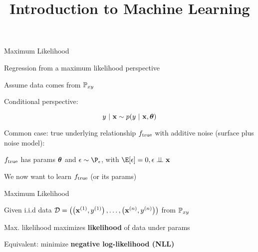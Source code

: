 \documentclass[11pt,compress,t,notes=noshow, xcolor=table]{beamer}
\title{Introduction to Machine Learning}
\begin{document}
    

\begin{framei}[sep=M]{Maximum Likelihood}

\item Regression from a maximum likelihood perspective
\item Assume data comes from $\mathbb{P}_{xy}$ 
\item Conditional perspective: 

$$
	y~|~ \mathbf{x} \sim p(y~|~\mathbf{x}, \bm{\theta})
$$

\item
Common case:
true underlying relationship $f_{\text{true}}$ with additive noise (surface plus noise model): 

%
{
}

\item $f_{\text{true}}$ has params $\bm{\theta}$ and $\eps \sim\P_\eps$, with $\E[\eps] = 0, \epsilon \perp \!\!\! \perp \xv$

\item We now want to learn $f_{\text{true}}$ (or its params)


\end{framei}
\begin{framei}[sep=M]{Maximum Likelihood}

\item Given i.i.d data $\mathcal{D} = \left( \left(\mathbf{x}^{(1)}, y^{(1)}\right), \ldots, \left(\mathbf{x}^{(n)}, y^{(n)}\right)\right)$ from $\mathbb{P}_{xy}$ 
\item Max. likelihood maximizes \textbf{likelihood} of data under params

%
{
}

\item Equivalent: minimize \textbf{negative log-likelihood (NLL)}

%
{
}

\end{framei}
\end{document}
